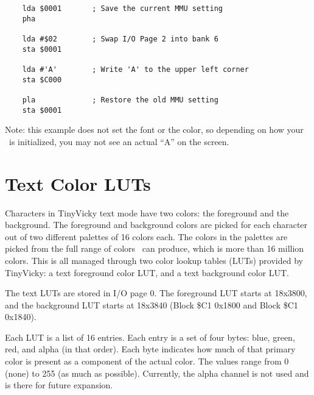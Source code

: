 \begin{verbatim}
    lda $0001       ; Save the current MMU setting
    pha

    lda #$02        ; Swap I/O Page 2 into bank 6
    sta $0001

    lda #'A'        ; Write 'A' to the upper left corner
    sta $C000

    pla             ; Restore the old MMU setting
    sta $0001
\end{verbatim}

Note: this example does not set the font or the color, so depending on how your \jr\ is initialized, you may not see an actual ``A'' on the screen.

\section*{Text Color LUTs}

Characters in TinyVicky text mode have two colors: the foreground and the background. The foreground and background colors are picked for each character out of two different palettes of 16 colors each. The colors in the palettes are picked from the full range of colors \jr\ can produce, which is more than 16 million colors. This is all managed through two color lookup tables (LUTs) provided by TinyVicky: a text foreground color LUT, and a text background color LUT.

The text LUTs are stored in I/O page 0. The foreground LUT starts at 18x3800, and the background LUT starts at 18x3840 (Block \$C1 0x1800 and Block \$C1 0x1840).

Each LUT is a list of 16 entries. Each entry is a set of four bytes: blue, green, red, and alpha (in that order). Each byte indicates how much of that primary color is present as a component of the actual color. The values range from 0 (none) to 255 (as much as possible). Currently, the alpha channel is not used and is there for future expansion.

